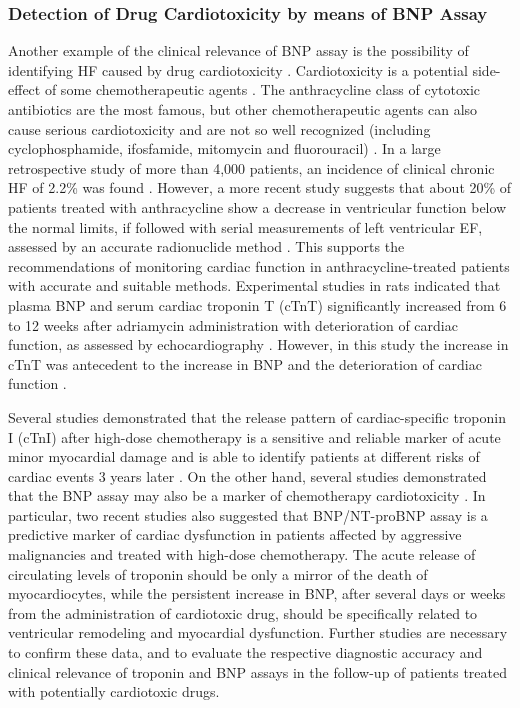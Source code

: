 \documentclass[14pt,a4paper,onecolumn]{extarticle}
\begin{document}
\subsubsection{ Detection of Drug Cardiotoxicity by means of BNP Assay}

Another example of the clinical relevance of BNP assay is the possibility of identifying
HF caused by drug cardiotoxicity \citep{bib3148} \citep{bib3149} \citep{bib3150} \citep{bib3151} \citep{bib3152} \citep{bib3153}. Cardiotoxicity is a potential side-effect of
some chemotherapeutic agents \citep{bib3154}. The anthracycline class of cytotoxic antibiotics are
the most famous, but other chemotherapeutic agents can also cause serious cardiotoxicity and are not so well recognized (including cyclophosphamide, ifosfamide, mitomycin and fluorouracil) \citep{bib3154}. In a large retrospective study of more than 4,000 patients,
an incidence of clinical chronic HF of 2.2\% was found \citep{bib3155}. However, a more recent study
suggests that about 20\% of patients treated with anthracycline show a decrease in ventricular function below the normal limits, if followed with serial measurements of left
ventricular EF, assessed by an accurate radionuclide method \citep{bib3156}. This supports the recommendations of monitoring cardiac function in anthracycline-treated patients with
accurate and suitable methods.
Experimental studies in rats indicated that plasma BNP and serum cardiac troponin
T (cTnT) significantly increased from 6 to 12 weeks after adriamycin administration with
deterioration of cardiac function, as assessed by echocardiography \citep{bib3157}. However, in
this study the increase in cTnT was antecedent to the increase in BNP and the deterioration of cardiac function \citep{bib3157}.

Several studies demonstrated that the release pattern of cardiac-specific troponin I
(cTnI) after high-dose chemotherapy is a sensitive and reliable marker of acute minor
myocardial damage and is able to identify patients at different risks of cardiac events
3 years later \citep{bib3158} \citep{bib3159} \citep{bib3160}. On the other hand, several studies demonstrated that the BNP
assay may also be a marker of chemotherapy cardiotoxicity \citep{bib3148} \citep{bib3149} \citep{bib3150} \citep{bib3151} \citep{bib3152}. In particular,
two recent studies \citep{bib3161} \citep{bib3162} also suggested that BNP/NT-proBNP assay is a predictive
marker of cardiac dysfunction in patients affected by aggressive malignancies and treated with high-dose chemotherapy. The acute release of circulating levels of troponin
should be only a mirror of the death of myocardiocytes, while the persistent increase in
BNP, after several days or weeks from the administration of cardiotoxic drug, should be
specifically related to ventricular remodeling and myocardial dysfunction. Further studies are necessary to confirm these data, and to evaluate the respective diagnostic accuracy and clinical relevance of troponin and BNP assays in the follow-up of patients
treated with potentially cardiotoxic drugs.
\end{document}
